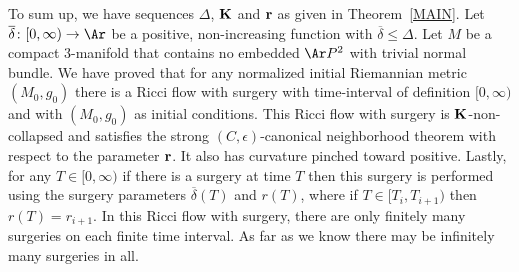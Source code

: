 To sum up, we have sequences $\Delta$, ${\bf K}$ and ${\bf r}$ as given in
Theorem~\ref{MAIN}. Let $\overline \delta\colon [0,\infty)\to \Ar$ be a
positive, non-increasing function with $\overline \delta\le \Delta$. Let $M$ be
a compact $3$-manifold that contains no embedded $\Ar P^2$ with trivial normal
bundle. We have proved that for any normalized initial Riemannian metric
$(M_0,g_0)$ there is a Ricci flow with surgery with time-interval of definition
$[0,\infty)$ and with $(M_0,g_0)$ as initial conditions. This Ricci flow with
surgery is ${\bf K}$-non-collapsed and satisfies the strong
$(C,\epsilon)$-canonical neighborhood theorem with respect to the parameter
${\bf r}$. It also has curvature pinched toward positive. Lastly, for any $T\in
[0,\infty)$ if there is a surgery at time $T$ then this surgery is performed
using the surgery parameters $\overline\delta(T)$ and $r(T)$, where if $T\in
[T_i,T_{i+1})$ then $r(T)=r_{i+1}$. In this Ricci flow with surgery, there are
only finitely many surgeries on each finite time interval. As far as we know
there may be infinitely many surgeries in all.
